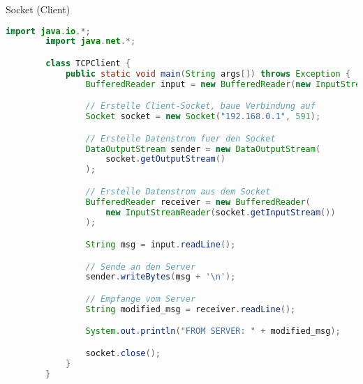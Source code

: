 \begin{example}{Socket (Client)}
    \begin{lstlisting}[language=Java]
        import java.io.*;
        import java.net.*;

        class TCPClient {
            public static void main(String args[]) throws Exception {
                BufferedReader input = new BufferedReader(new InputStreamReader(System.in));

                // Erstelle Client-Socket, baue Verbindung auf
                Socket socket = new Socket("192.168.0.1", 591);

                // Erstelle Datenstrom fuer den Socket
                DataOutputStream sender = new DataOutputStream(
                    socket.getOutputStream()
                );

                // Erstelle Datenstrom aus dem Socket
                BufferedReader receiver = new BufferedReader(
                    new InputStreamReader(socket.getInputStream())
                );

                String msg = input.readLine();

                // Sende an den Server
                sender.writeBytes(msg + '\n');

                // Empfange vom Server
                String modified_msg = receiver.readLine();

                System.out.println("FROM SERVER: " + modified_msg);

                socket.close();
            }
        }
    \end{lstlisting}
\end{example}

